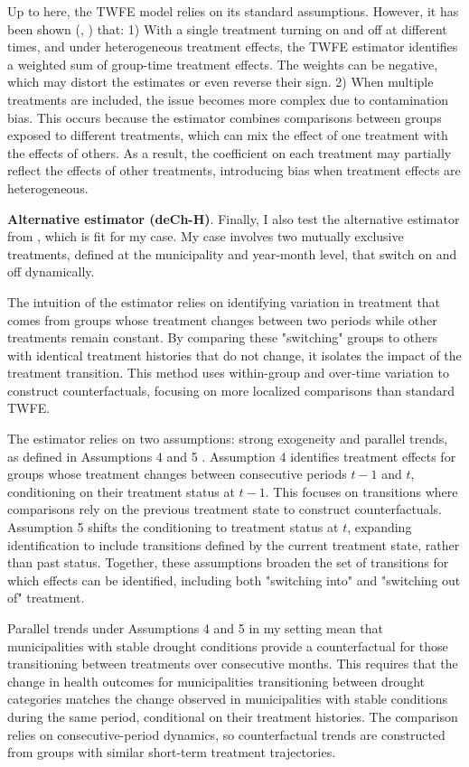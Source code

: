 Up to here, the TWFE model relies on its standard assumptions. However, it has been shown (\cite{deChaisemartin2020}, \cite{deChaisemartin2023}) that: 1) With a single treatment turning on and off at different times, and under heterogeneous treatment effects, the TWFE estimator identifies a weighted sum of group-time treatment effects. The weights can be negative, which may distort the estimates or even reverse their sign. 2) When multiple treatments are included, the issue becomes more complex due to contamination bias. This occurs because the estimator combines comparisons between groups exposed to different treatments, which can mix the effect of one treatment with the effects of others. As a result, the coefficient on each treatment may partially reflect the effects of other treatments, introducing bias when treatment effects are heterogeneous.


\textbf{Alternative estimator (deCh-H)}. Finally, I also test the alternative estimator from \cite{deChaisemartin2023}, which is fit for my case. My case involves two mutually exclusive treatments, defined at the municipality and year-month level, that switch on and off dynamically.

The intuition of the estimator relies on identifying variation in treatment that comes from groups whose treatment changes between two periods while other treatments remain constant. By comparing these "switching" groups to others with identical treatment histories that do not change, it isolates the impact of the treatment transition. This method uses within-group and over-time variation to construct counterfactuals, focusing on more localized comparisons than standard TWFE.

The estimator relies on two assumptions: strong exogeneity and parallel trends, as defined in Assumptions 4 and 5 \cite{deChaisemartin2023}. Assumption 4 identifies treatment effects for groups whose treatment changes between consecutive periods $t-1$ and $t$, conditioning on their treatment status at $t-1$. This focuses on transitions where comparisons rely on the previous treatment state to construct counterfactuals. Assumption 5 shifts the conditioning to treatment status at $t$, expanding identification to include transitions defined by the current treatment state, rather than past status. Together, these assumptions broaden the set of transitions for which effects can be identified, including both "switching into" and "switching out of" treatment.

Parallel trends under Assumptions 4 and 5 in my setting mean that municipalities with stable drought conditions provide a counterfactual for those transitioning between treatments over consecutive months. This requires that the change in health outcomes for municipalities transitioning between drought categories matches the change observed in municipalities with stable conditions during the same period, conditional on their treatment histories. The comparison relies on consecutive-period dynamics, so counterfactual trends are constructed from groups with similar short-term treatment trajectories.


